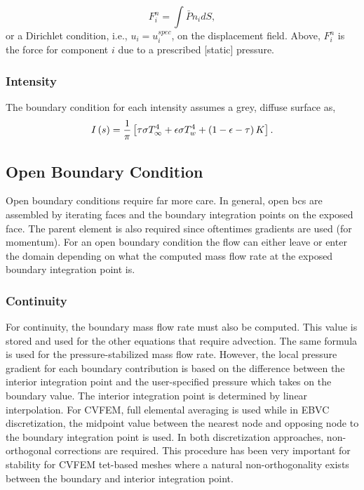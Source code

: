 {\begin{equation}
 F^n_i = \int \bar{P} n_i dS,
\label{displacement}
\end{equation}
%
or a Dirichlet condition, i.e., $u_i = u^{spec}_i$, on the displacement field. Above, $F^n_i$ is the force for
component $i$ due to a prescribed [static] pressure. 

\subsubsection{Intensity}
The boundary condition for each intensity assumes a grey, diffuse surface as, 
\begin{equation}
  I\left(s\right) = {1 \over \pi} \left[ \tau \sigma T_\infty^4 
                  + \epsilon \sigma T_w^4
                  + \left(1 - \epsilon - \tau \right) K \right].
\label{intBc}
\end{equation}

\subsection{Open Boundary Condition}
Open boundary conditions require far more care. In general,
open bcs are assembled by iterating faces and the boundary integration
points on the exposed face. The parent element is also required
since oftentimes gradients are used (for momentum). For an open boundary condition
the flow can either leave or enter the domain depending on what the computed mass
flow rate at the exposed boundary integration point is.

\subsubsection{Continuity}
For continuity, the boundary mass flow rate must also be computed. This value is stored and used
for the other equations that require advection. The same formula is used for the pressure-stabilized 
mass flow rate. However, the local pressure gradient
for each boundary contribution is based on the difference between the interior integration
point and the user-specified pressure which takes on the boundary value. The interior integration 
point is determined by linear interpolation. For CVFEM, full elemental averaging is used while in EBVC discretization,
the midpoint value between the nearest node and opposing node to the boundary integration point is used. In both
discretization approaches, non-orthogonal corrections are required. This procedure has been very important for 
stability for CVFEM tet-based meshes where a natural non-orthogonality exists between the boundary and
interior integration point.

}
